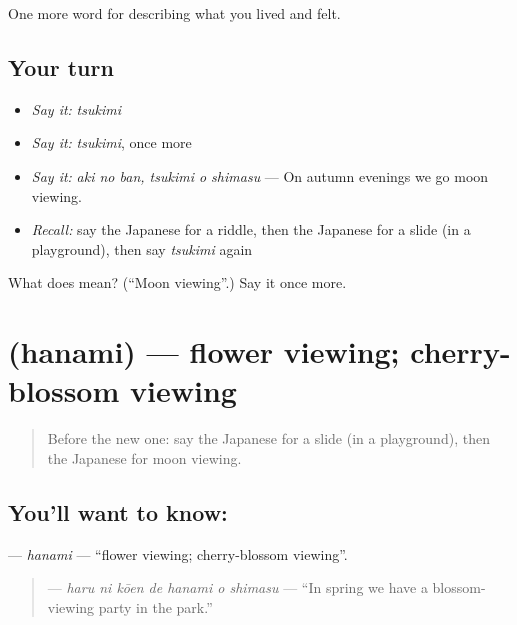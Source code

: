 \begin{grammarlens}[title={What you've built}]
One more word for describing what you lived and felt.
\end{grammarlens}

\subsection*{Your turn}
\begin{itemize}
\raggedright
  \item \emph{Say it:} \emph{tsukimi}
  \item \emph{Say it:} \emph{tsukimi}, once more
  \item \emph{Say it:} \emph{aki no ban, tsukimi o shimasu} — On autumn evenings we go moon viewing.
  \item \emph{Recall:} say the Japanese for a riddle, then the Japanese for a slide (in a playground), then say \emph{tsukimi} again
\end{itemize}

\begin{tcolorbox}[breakable,colback=teal!4,colframe=teal!35!black,title={Before you move on}]
What does  mean? (\textquotedblleft{}Moon viewing\textquotedblright{}.) Say it once more.
\end{tcolorbox}
\section[\texorpdfstring{\ja{はなみ} (hanami)}{はなみ (hanami)}]{ (hanami) — flower viewing; cherry-blossom viewing}

\label{lesson:JA-C501-hanami}



\begin{quote}
Before the new one: say the Japanese for a slide (in a playground), then the Japanese for moon viewing.
\end{quote}

\subsection*{You'll want to know: }
\textbf{} — \emph{hanami} — \textquotedblleft{}flower viewing; cherry-blossom viewing\textquotedblright{}.

\begin{quote}
\textbf{   } — \emph{haru ni kōen de hanami o shimasu} — \textquotedblleft{}In spring we have a blossom-viewing party in the park.\textquotedblright{}
\end{quote}

